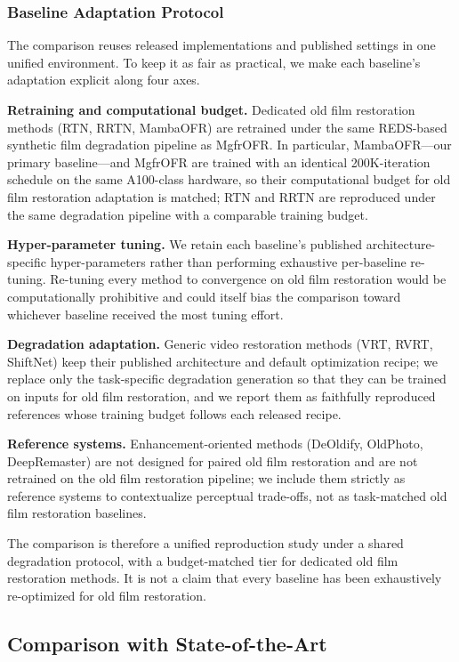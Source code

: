 \documentclass[symmetry,article,submit,pdftex,moreauthors]{Definitions/mdpi}
\begin{document}
\subsubsection{Baseline Adaptation Protocol}
\label{subsubsec:baseline_adaptation}

The comparison reuses released implementations and published settings in one unified environment. To keep it as fair as practical, we make each baseline's adaptation explicit along four axes.

\textbf{Retraining and computational budget.} Dedicated old film restoration methods (RTN, RRTN, MambaOFR) are retrained under the same REDS-based synthetic film degradation pipeline as MgfrOFR. In particular, MambaOFR---our primary baseline---and MgfrOFR are trained with an identical 200K-iteration schedule on the same A100-class hardware, so their computational budget for old film restoration adaptation is matched; RTN and RRTN are reproduced under the same degradation pipeline with a comparable training budget.

\textbf{Hyper-parameter tuning.} We retain each baseline's published architecture-specific hyper-parameters rather than performing exhaustive per-baseline re-tuning. Re-tuning every method to convergence on old film restoration would be computationally prohibitive and could itself bias the comparison toward whichever baseline received the most tuning effort.

\textbf{Degradation adaptation.} Generic video restoration methods (VRT, RVRT, ShiftNet) keep their published architecture and default optimization recipe; we replace only the task-specific degradation generation so that they can be trained on inputs for old film restoration, and we report them as faithfully reproduced references whose training budget follows each released recipe.

\textbf{Reference systems.} Enhancement-oriented methods (DeOldify, OldPhoto, DeepRemaster) are not designed for paired old film restoration and are not retrained on the old film restoration pipeline; we include them strictly as reference systems to contextualize perceptual trade-offs, not as task-matched old film restoration baselines.

The comparison is therefore a unified reproduction study under a shared degradation protocol, with a budget-matched tier for dedicated old film restoration methods. It is not a claim that every baseline has been exhaustively re-optimized for old film restoration.

\subsection{Comparison with State-of-the-Art}
\label{subsec:comparison_sota}
\end{document}
